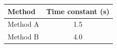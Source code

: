 \par
\begin{tabular}{@{}lc@{}}
  \toprule
  Method & Time constant (s) \\
  \midrule
  Method A & 1.5 \\
  Method B & 4.0 \\
  \bottomrule
\end{tabular}
\par
